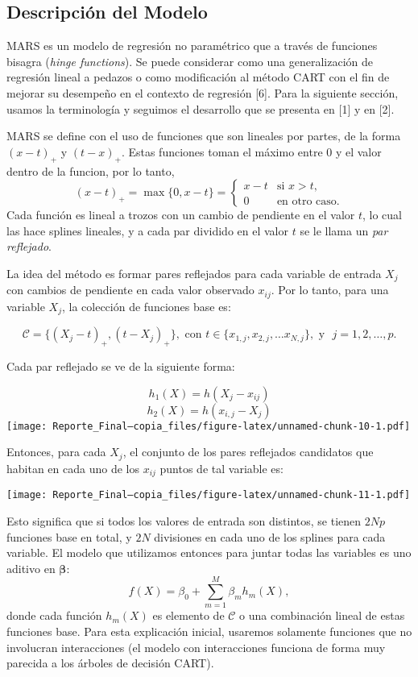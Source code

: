 \documentclass[
]{article}
\begin{document}
\hypertarget{descripciuxf3n-del-modelo}{%
\subsection{Descripción del Modelo}\label{descripciuxf3n-del-modelo}}

MARS es un modelo de regresión no paramétrico que a través de funciones
bisagra (\emph{hinge functions}). Se puede considerar como una
generalización de regresión lineal a pedazos o como modificación al
método CART con el fin de mejorar su desempeño en el contexto de
regresión {[}6{]}. Para la siguiente sección, usamos la terminología y
seguimos el desarrollo que se presenta en {[}1{]} y en {[}2{]}.

MARS se define con el uso de funciones que son lineales por partes, de
la forma \((x - t)_+\) y \((t - x)_+\). Estas funciones toman el máximo
entre 0 y el valor dentro de la funcion, por lo tanto, \[
(x - t)_+ = \max\{ 0, x - t \}= \begin{cases} 
x - t &\mbox{si } x > t, \\
0 & \mbox{en otro caso}. \end{cases}
\] Cada función es lineal a trozos con un cambio de pendiente en el
valor \(t\), lo cual las hace splines lineales, y a cada par dividido en
el valor \(t\) se le llama un \emph{par reflejado}.

La idea del método es formar pares reflejados para cada variable de
entrada \(X_j\) con cambios de pendiente en cada valor observado
\(x_{ij}\). Por lo tanto, para una variable \(X_j\), la colección de
funciones base es:

\[
\mathcal{C} = \{ (X_j - t)_+, (t - X_j)_+ \}, \text{ con } t \in \{ x_{1,j}, x_{2,j}, \ldots x_{N,j} \}, \text{ y } \,\, j = 1,2, \ldots , p.
\]

Cada par reflejado se ve de la siguiente forma:

\[
h_1(X) = h(X_j - x_{ij}) 
\] \[
h_2(X) = h(x_{i,j} - X_j)
\]
\texttt{[image: Reporte\_Final---copia\_files/figure-latex/unnamed-chunk-10-1.pdf]}

Entonces, para cada \(X_j\), el conjunto de los pares reflejados
candidatos que habitan en cada uno de los \(x_{ij}\) puntos de tal
variable es:

\texttt{[image: Reporte\_Final---copia\_files/figure-latex/unnamed-chunk-11-1.pdf]}

Esto significa que si todos los valores de entrada son distintos, se
tienen \(2Np\) funciones base en total, y \(2N\) divisiones en cada uno
de los splines para cada variable. El modelo que utilizamos entonces
para juntar todas las variables es uno aditivo en \(\boldsymbol\beta\):
\[
f(X) = \beta_0 + \sum_{m=1}^M \beta_m h_m(X),
\] donde cada función \(h_m(X)\) es elemento de \(\mathcal{C}\) o una
combinación lineal de estas funciones base. Para esta explicación
inicial, usaremos solamente funciones que no involucran interacciones
(el modelo con interacciones funciona de forma muy parecida a los
árboles de decisión CART).
\end{document}
